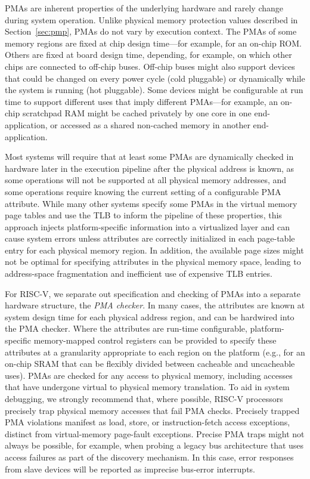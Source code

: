 PMAs are inherent properties of the underlying hardware and rarely
change during system operation.  Unlike physical memory protection
values described in Section~\ref{sec:pmp}, PMAs do not vary by
execution context.  The PMAs of some memory regions are fixed at chip
design time---for example, for an on-chip ROM.  Others are fixed at
board design time, depending, for example, on which other chips are
connected to off-chip buses.  Off-chip buses might also support
devices that could be changed on every power cycle (cold pluggable) or
dynamically while the system is running (hot pluggable).  Some devices
might be configurable at run time to support different uses that imply
different PMAs---for example, an on-chip scratchpad RAM might be
cached privately by one core in one end-application, or accessed as a
shared non-cached memory in another end-application.

Most systems will require that at least some PMAs are dynamically
checked in hardware later in the execution pipeline after the physical
address is known, as some operations will not be supported at all
physical memory addresses, and some operations require knowing the
current setting of a configurable PMA attribute.  While many other systems
specify some PMAs in the virtual memory page tables and use the TLB to
inform the pipeline of these properties, this approach injects platform-specific
information into a virtualized layer and can cause system errors
unless attributes are correctly initialized in each page-table entry
for each physical memory region.  In addition, the available
page sizes might not be optimal for specifying attributes in the
physical memory space, leading to address-space fragmentation and
inefficient use of expensive TLB entries.

For RISC-V, we separate out specification and checking of PMAs into a
separate hardware structure, the {\em PMA checker}.  In many cases,
the attributes are known at system design time for each physical
address region, and can be hardwired into the PMA checker.  Where the
attributes are run-time configurable, platform-specific memory-mapped
control registers can be provided to specify these attributes at a
granularity appropriate to each region on the platform (e.g., for an
on-chip SRAM that can be flexibly divided between cacheable and
uncacheable uses).  PMAs are checked for any access to physical
memory, including accesses that have undergone virtual to physical
memory translation.  To aid in system debugging, we strongly recommend
that, where possible, RISC-V processors precisely trap physical memory
accesses that fail PMA checks.  Precisely trapped PMA violations manifest
as load, store, or instruction-fetch access exceptions, distinct from
virtual-memory page-fault exceptions. Precise PMA traps might not always be
possible, for example, when probing a legacy bus architecture that
uses access failures as part of the discovery mechanism.  In this
case, error responses from slave devices will be reported as imprecise
bus-error interrupts.

